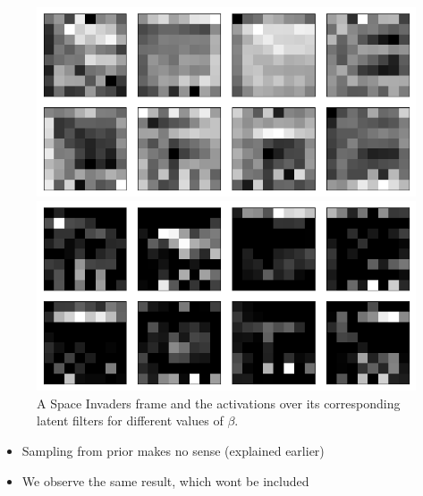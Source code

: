 \begin{figure}[h!]
\begin{minipage}{0.55\textwidth}
\caption{$\beta = 1$}
\includegraphics[scale=0.42]{figures/results/weighted_average/beta_2_convolutional_layers_sample_3.png}
\caption{$\beta = 2$}
\includegraphics[scale=0.42]{figures/results/weighted_average/beta_4_convolutional_layers_sample_3.png}
\caption{$\beta = 4$}
\end{minipage}
\caption{A Space Invaders frame and the activations over its corresponding latent filters for different values of $\beta$.}
\label{fig:weighted_average_originals_and_latent_filters}
\end{figure}

\begin{itemize}
\item Sampling from prior makes no sense (explained earlier)
\item We observe the same result, which wont be included
\end{itemize}



